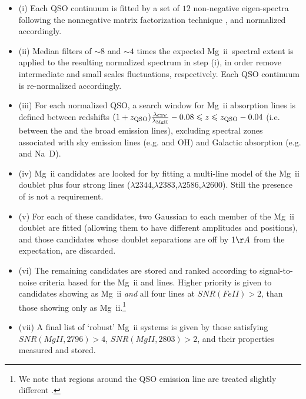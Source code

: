 \documentclass[useAMS,usenatbib]{mn2e}
\newcommand{\mgii}{Mg~{\sc ii}\xspace}
\begin{document}
\begin{itemize}
\item (i) Each QSO continuum is fitted by a set of $12$ non-negative
eigen-spectra following the nonnegative matrix factorization technique
\citep[NMF;][]{Lee1999;Blanton2007}, and normalized accordingly.

\item (ii) Median filters of $\sim 8$ and $\sim 4$ times the expected
\mgii~spectral extent is applied to the resulting normalized spectrum
in step (i), in order remove intermediate and small scales
fluctuations, respectively. Each QSO continuum is re-normalized
accordingly.

\item (iii) For each normalized QSO, a search window for \mgii
  absorption lines is defined between redshifts $(1+z_{\rm
    QSO})\frac{\lambda_{\rm CIV}}{\lambda_{\rm MgII}} - 0.08 \le z \le
  z_{\rm QSO} - 0.04$ (i.e. between the  and the 
  broad emission lines), excluding spectral zones associated with sky
  emission lines (e.g.  and OH) and Galactic absorption
  (e.g.  and Na~D).

\item (iv) \mgii candidates are looked for by fitting a multi-line
  model of the \mgii doublet plus four strong  lines
  ($\lambda 2344$,$\lambda 2383$,$\lambda 2586$,$\lambda 2600$). Still
  the presence of  is not a requirement.

\item (v) For each of these candidates, two Gaussian to each member of
  the \mgii doublet are fitted (allowing them to have different
  amplitudes and positions), and those candidates whose doublet
  separations are off by $1 \AA$ from the expectation, are discarded.

\item (vi) The remaining candidates are stored and ranked according to
  signal-to-noise criteria based for the \mgii and 
  lines. Higher priority is given to candidates showing as \mgii {\it
    and} all four  lines at $SNR(FeII)>2$, than those
  showing only as \mgii.\footnote{We note that regions around the QSO
     emission line are treated slightly different
    \citep[see][for further details]{Zhu2013}.}

\item (vii) A final list of `robust' \mgii systems is given by those
  satisfying $SNR(MgII,2796)>4$, $SNR(MgII,2803)>2$, and their
  properties measured and stored.

\end{itemize}
\end{document}
